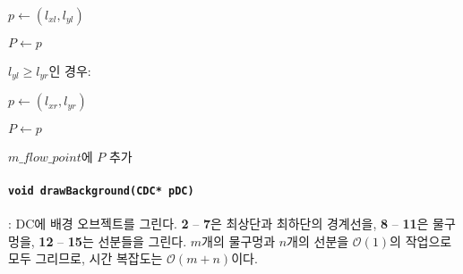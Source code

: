 \begin{algorithm}
\begin{algorithm}
\begin{algorithm}
			\item $p \leftarrow \left(l_{xl}, l_{yl}\right)$
			\item $P \leftarrow p$
		\end{algorithm} 
		\item $l_{yl} \geq l_{yr}$인 경우:
		\begin{algorithm}
			\item $p \leftarrow \left(l_{xr}, l_{yr}\right)$
			\item $P \leftarrow p$
		\end{algorithm} 
		\item $m\_flow\_point$에 $P$ 추가
	\end{algorithm} 
\end{algorithm}

\paragraph{\texttt{void drawBackground(CDC* pDC)}}: DC에 배경 오브젝트를 그린다.
\textbf{2} -- \textbf{7}은 최상단과 최하단의 경계선을, \textbf{8} -- \textbf{11}은 물구멍을,
\textbf{12} -- \textbf{15}는 선분들을 그린다. 
$m$개의 물구멍과 $n$개의 선분을 $\mathcal{O}\left(1\right)$의 작업으로 모두 그리므로, 
시간 복잡도는 $\mathcal{O}\left(m+n\right)$이다.

